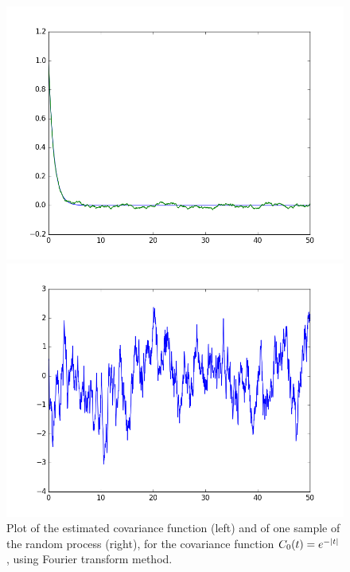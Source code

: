 \documentclass[a4paper,11pt]{article}
\theoremstyle{definition}
\theoremstyle{plain}
\theoremstyle{remark}
\DeclarePairedDelimiter{\abs}{\lvert}{\rvert}
\begin{document}
\begin{figure}[htbp]
\centering
\begin{minipage}[c]{.47\textwidth}
\includegraphics[width=\textwidth,
keepaspectratio]{ex6_C0_dft_cov.png}
\end{minipage}
\hspace{4mm}
\begin{minipage}[c]{.47\textwidth}
\includegraphics[width=\textwidth,
keepaspectratio]{ex6_C0_dft_sample.png}
\end{minipage}
\caption{ \label{figure:ex6_C0_dft} Plot of the estimated covariance function (left) and of one sample of the random process (right), for the covariance function $C_0(t) = e^{-\abs{t}}$, using Fourier transform method.}
\end{figure}
\end{document}

